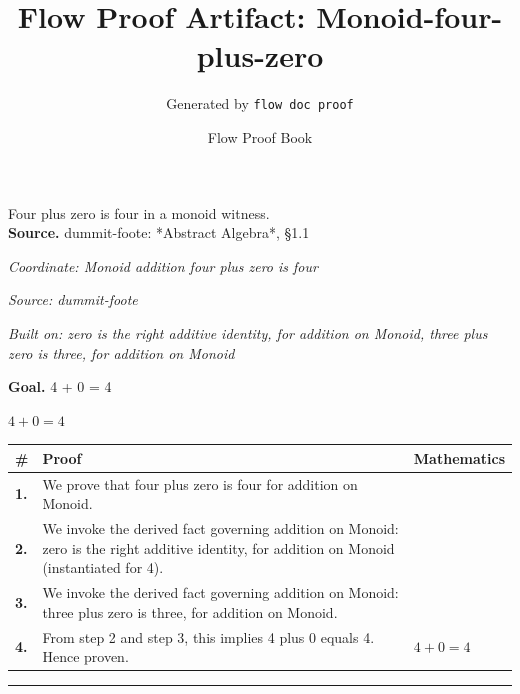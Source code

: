 \documentclass[11pt]{article}
\title{Flow Proof Artifact: Monoid-four-plus-zero}
\author{Generated by \texttt{flow doc proof}}
\date{Flow Proof Book}
\theoremstyle{definition}
\begin{document}
\maketitle
Four plus zero is four in a monoid witness.\\[0.5em]
\textbf{Source.} dummit-foote: *Abstract Algebra*, §1.1\\[0.5em]
\bigskip
{}\par
\smallskip\noindent\textit{Coordinate: Monoid \cdot addition \cdot four plus zero is four}\par
\smallskip\noindent\textit{Source: dummit-foote}\par
\smallskip\noindent\textit{Built on: zero is the right additive identity, for addition on Monoid, three plus zero is three, for addition on Monoid}\par
\medskip
\noindent\textbf{Goal.} 4 + 0 = 4\par
\noindent$\displaystyle 4 + 0 = 4$\par
\medskip
\noindent
\begin{tabular}{@{} >{\raggedright\arraybackslash}p{} >{\raggedright\arraybackslash}p{} >{\raggedleft\arraybackslash}p{} @{}}
\textbf{\#} & \textbf{Proof} & \textbf{Mathematics} \\
\midrule
\textbf{1.} & We prove that four plus zero is four for addition on Monoid. & \\[0.45em]
\textbf{2.} & We invoke the derived fact governing addition on Monoid: zero is the right additive identity, for addition on Monoid (instantiated for 4). & \\[0.45em]
\textbf{3.} & We invoke the derived fact governing addition on Monoid: three plus zero is three, for addition on Monoid. & \\[0.45em]
\textbf{4.} & From step 2 and step 3, this implies 4 plus 0 equals 4. Hence proven. & $\displaystyle 4 + 0 = 4$ \\[0.45em]
\bottomrule
\end{tabular}
\label{thm:Monoid-addition-four_plus_zero_is_four}
\par\medskip\hrule
\end{document}
